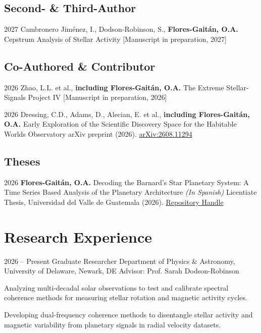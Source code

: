 \documentclass[11pt, a4paper]{article}
\begin{document}
\subsection*{Second- \& Third-Author}
\rubenzahlPub
    {2027}
    {Cambronero Jiménez, I., Dodson-Robinson, S., \textbf{Flores-Gaitán, O.A.}}
    {Cepstrum Analysis of Stellar Activity}
    {[Manuscript in preparation, 2027]}

\subsection*{Co-Authored \& Contributor}
\rubenzahlPub
    {2026}
    {Zhao, L.L. et al., \textbf{including Flores-Gaitán, O.A.}}
    {The Extreme Stellar-Signals Project IV}
    {[Manuscript in preparation, 2026]}

\rubenzahlPub
    {2026}
    {Dressing, C.D., Adams, D., Alecian, E. et al., \textbf{including Flores-Gaitán, O.A.}}
    {Early Exploration of the Scientific Discovery Space for the Habitable Worlds Observatory}
    {arXiv preprint (2026). \href{https://arxiv.org/abs/2608.11294}{arXiv:2608.11294}}

\subsection*{Theses}
\rubenzahlPub
    {2026}
    {\textbf{Flores-Gaitán, O.A.}}
    {Decoding the Barnard's Star Planetary System: A Time Series Based Analysis of the Planetary Architecture \textnormal{\textit{(In Spanish)}}}
    {Licentiate Thesis, Universidad del Valle de Guatemala (2026). \href{https://repositorio.uvg.edu.gt/handle/123456789/6892}{Repository Handle}}

\section{Research Experience}

\rubenzahlEntry
    {2026 – Present}
    {Graduate Researcher}
    {Department of Physics \& Astronomy, University of Delaware, Newark, DE}
    {Advisor: Prof. Sarah Dodson-Robinson}
    {
        \item Analyzing multi-decadal solar observations to test and calibrate spectral coherence methods for measuring stellar rotation and magnetic activity cycles.
        \item Developing dual-frequency coherence methods to disentangle stellar activity and magnetic variability from planetary signals in radial velocity datasets.
    }
\end{document}
